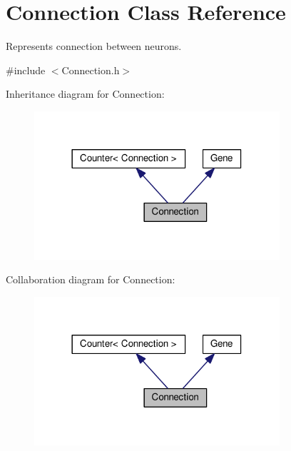 \hypertarget{classConnection}{}\section{Connection Class Reference}
\label{classConnection}


Represents connection between neurons.  




{\ttfamily \#include $<$Connection.\+h$>$}



Inheritance diagram for Connection\+:
\nopagebreak
\begin{figure}[H]
\begin{center}
\leavevmode
\includegraphics[width=258pt]{classConnection__inherit__graph}
\end{center}
\end{figure}


Collaboration diagram for Connection\+:
\nopagebreak
\begin{figure}[H]
\begin{center}
\leavevmode
\includegraphics[width=258pt]{classConnection__coll__graph}
\end{center}
\end{figure}
